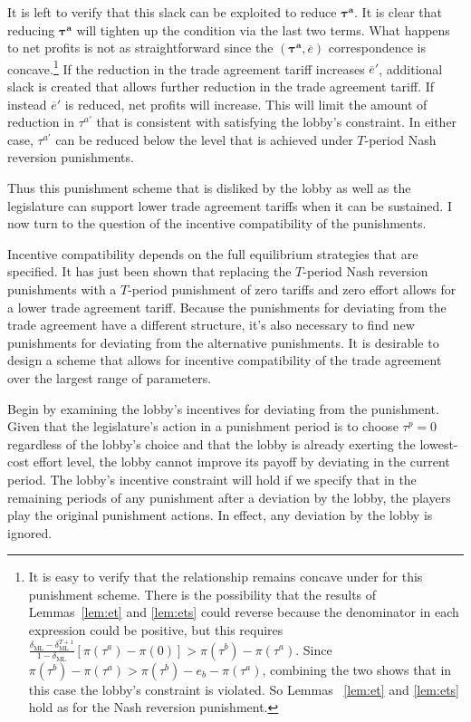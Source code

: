 \documentclass[authoryear, review]{elsarticle}
\newcommand{\ov}{\overline}
\newcommand{\bta}{\bm{\tau^a}}
\newcommand{\de}{\delta}
\begin{document}
It is left to verify that this slack can be exploited to reduce $\bta$. It is clear that reducing $\bta$ will tighten up the condition via the last two terms. What happens to net profits is not as straightforward since the $\left(\bta,\ov{e}\right)$ correspondence is concave.\footnote{It is easy to verify that the relationship remains concave under for this punishment scheme. There is the possibility that the results of Lemmas~\ref{lem:et} and \ref{lem:ets} could reverse because the denominator in each expression could be positive, but this requires $\frac{\de_\text{ML} - \de_\text{ML}^{T+1}}{1-\de_\text{ML}}\left[\pi(\tau^a) - \pi(0)\right] > \pi(\tau^b) - \pi(\tau^a)$. Since $\pi(\tau^b) - \pi(\tau^a) > \pi(\tau^b) - e_b - \pi(\tau^a)$, combining the two shows that in this case the lobby's constraint is violated. So Lemmas ~\ref{lem:et} and \ref{lem:ets} hold as for the Nash reversion punishment.} If the reduction in the trade agreement tariff increases $\ov{e}'$, additional slack is created that allows further reduction in the trade agreement tariff. If instead $\ov{e}'$ is reduced, net profits will increase. This will limit the amount of reduction in $\tau^{a'}$ that is consistent with satisfying the lobby's constraint. In either case, $\tau^{a'}$ can be reduced below the level that is achieved under $T$-period Nash reversion punishments.

Thus this punishment scheme that is disliked by the lobby as well as the legislature can support lower trade agreement tariffs when it can be sustained. I now turn to the question of the incentive compatibility of the punishments.

Incentive compatibility depends on the full equilibrium strategies that are specified. It has just been shown that replacing the $T$-period Nash reversion punishments with a $T$-period punishment of zero tariffs and zero effort allows for a lower trade agreement tariff. Because the punishments for deviating from the trade agreement have a different structure, it's also necessary to find new punishments for deviating from the alternative punishments. It is desirable to design a scheme that allows for incentive compatibility of the trade agreement over the largest range of parameters.

Begin by examining the lobby's incentives for deviating from the punishment. Given that the legislature's action in a punishment period is to choose $\tau^p =0$ regardless of the lobby's choice and that the lobby is already exerting the lowest-cost effort level, the lobby cannot improve its payoff by deviating in the current period. The lobby's incentive constraint will hold if we specify that in the remaining periods of any punishment after a deviation by the lobby, the players play the original punishment actions. In effect, any deviation by the lobby is ignored.
\end{document}
